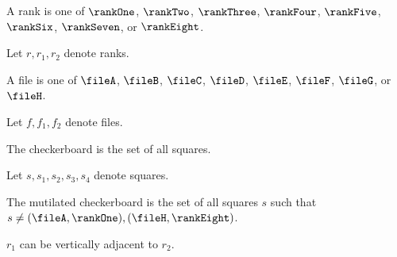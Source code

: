 

%
%
\begin{inductive}
   A rank is one of
   $\rankOne$, $\rankTwo$, $\rankThree$, $\rankFour$, $\rankFive$, $\rankSix$, $\rankSeven$, or $\rankEight$.
\end{inductive}

Let $r, r_1, r_2$ denote ranks.


%
\begin{inductive}
   A file is one of
   $\fileA$, $\fileB$, $\fileC$, $\fileD$, $\fileE$, $\fileF$, $\fileG$, or $\fileH$.
\end{inductive}

Let $f, f_1, f_2$ denote files.





\begin{definition}
   The checkerboard is the set of all squares.
\end{definition}

Let $s, s_1, s_2, s_3, s_4$ denote squares.




\begin{definition}
   The mutilated checkerboard is the set of all squares $s$
   such that $s \neq (\fileA, \rankOne), (\fileH, \rankEight)$.
\end{definition}





\begin{signature}
   $r_1$ can be vertically adjacent to $r_2$.
\end{signature}

